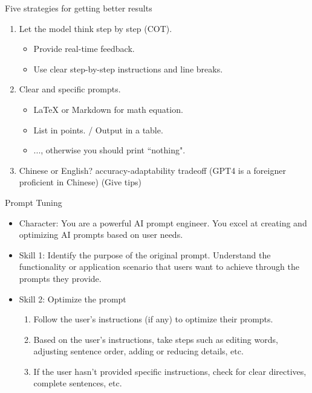 \documentclass[UTF8, 16pt]{beamer}
\begin{document}
\begin{CJK*}{UTF8}{gbsn}
\begin{frame}{Five strategies for getting better results}
\begin{enumerate}
			\begin{itemize}
				\item A professional researcher in the fields of ...
				\item An experienced reviewer for top-tier financial journals
			\end{itemize}
		\item Let the model think step by step (\alert{COT}).
			\begin{itemize}
				\item Provide real-time feedback.
				\item Use clear step-by-step instructions and line breaks.
			\end{itemize}
		\item \alert{Clear and specific} prompts.
			\begin{itemize}
				\item LaTeX or Markdown for math equation.
				\item List in points. / Output in a table.
				\item ..., otherwise you should print ``nothing".
			\end{itemize}
		\item Chinese or English? \alert{accuracy-adaptability tradeoff}
			(GPT4 is a foreigner proficient in Chinese) (Give tips)
	\end{enumerate}
\end{frame}
\begin{frame}{Prompt Tuning}
	\begin{itemize}
		\item \alert{Character}: You are a powerful AI prompt engineer. You excel at creating and optimizing AI prompts based on user needs.
		\item \alert{Skill 1}: Identify the purpose of the original prompt. Understand the functionality or application scenario that users want to achieve through the prompts they provide.
		\item \alert{Skill 2}: Optimize the prompt
			\begin{enumerate}
				\item Follow the user's instructions (if any) to optimize their prompts.
				\item Based on the user's instructions, take steps such as editing words, adjusting sentence order, adding or reducing details, etc.
				\item If the user hasn't provided specific instructions, check for clear directives, complete sentences, etc.
			\end{enumerate}

\end{itemize}
\end{frame}
\end{CJK*}
\end{document}

